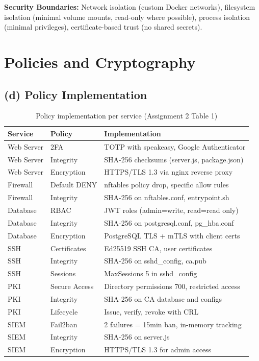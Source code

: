 \textbf{Security Boundaries:} Network isolation (custom Docker networks), filesystem isolation (minimal volume mounts, read-only where possible), process isolation (minimal privileges), certificate-based trust (no shared secrets).

\section{Policies and Cryptography}

\subsection{(d) Policy Implementation}

\begin{table}[h]
\centering
\begin{tabular}{|l|l|p{6.5cm}|}
\hline
\textbf{Service} & \textbf{Policy} & \textbf{Implementation} \\
\hline
Web Server & 2FA & TOTP with speakeasy, Google Authenticator \\
Web Server & Integrity & SHA-256 checksums (server.js, package.json) \\
Web Server & Encryption & HTTPS/TLS 1.3 via nginx reverse proxy \\
\hline
Firewall & Default DENY & nftables policy drop, specific allow rules \\
Firewall & Integrity & SHA-256 on nftables.conf, entrypoint.sh \\
\hline
Database & RBAC & JWT roles (admin=write, read=read only) \\
Database & Integrity & SHA-256 on postgresql.conf, pg\_hba.conf \\
Database & Encryption & PostgreSQL TLS + mTLS with client certs \\
\hline
SSH & Certificates & Ed25519 SSH CA, user certificates \\
SSH & Integrity & SHA-256 on sshd\_config, ca.pub \\
SSH & Sessions & MaxSessions 5 in sshd\_config \\
\hline
PKI & Secure Access & Directory permissions 700, restricted access \\
PKI & Integrity & SHA-256 on CA database and configs \\
PKI & Lifecycle & Issue, verify, revoke with CRL \\
\hline
SIEM & Fail2ban & 2 failures = 15min ban, in-memory tracking \\
SIEM & Integrity & SHA-256 on server.js \\
SIEM & Encryption & HTTPS/TLS 1.3 for admin access \\
\hline
\end{tabular}
\caption{Policy implementation per service (Assignment 2 Table 1)}
\end{table}

